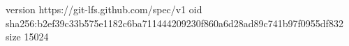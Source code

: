 version https://git-lfs.github.com/spec/v1
oid sha256:b2ef39c33b575e1182c6ba711444209230f860a6d28ad89c741b97f0955df832
size 15024
